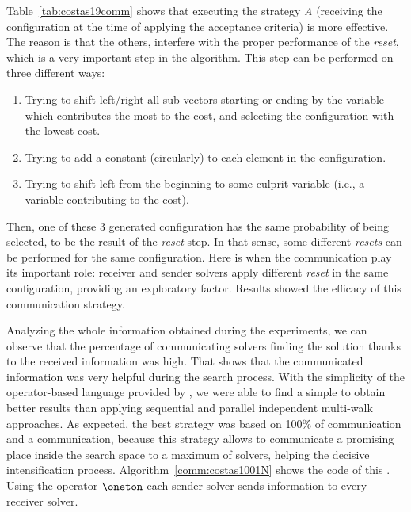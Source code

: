 Table~\ref{tab:costas19comm} shows that \sosets{} executing the strategy {\it A} (receiving the configuration at the time of applying the acceptance criteria) is more effective. The reason is that the others, interfere with the proper performance of the {\it reset}, which is a very important step in the algorithm. This step can be performed on three different ways:
\begin{enumerate}
\item Trying to shift left/right all sub-vectors starting or ending by the variable which contributes the most to the cost, and selecting the configuration with the lowest cost.
\item Trying to add a constant (circularly) to each element in the configuration.
\item Trying to shift left from the beginning to some culprit variable (i.e., a variable contributing to the cost).
\end{enumerate}
Then, one of these 3 generated configuration has the same probability of being selected, to be the result of the \textit{reset} step. In that sense, some different \textit{resets} can be performed for the same configuration. Here is when the communication play its important role: receiver and sender solvers apply different \textit{reset} in the same configuration, providing an exploratory factor. Results showed the efficacy of this communication strategy.
 
Analyzing the whole information obtained during the experiments, we can observe that the percentage of communicating solvers finding the solution thanks to the received information was high. That shows that the communicated information was very helpful during the search process. 
With the simplicity of the operator-based language provided by \posl{}, we were able to find a simple \commstr{} to obtain better results than applying sequential and parallel independent multi-walk approaches. As expected, the best strategy was based on 100\% of communication and a \oneTn{} communication, because this strategy allows to communicate a promising place inside the search space to a maximum of solvers, helping the decisive intensification process.
Algorithm~\ref{comm:costas1001N} shows the code of this \commstr{}. %
Using the \oneTn{} operator $\oneton$ each sender solver sends information to every receiver solver. 

